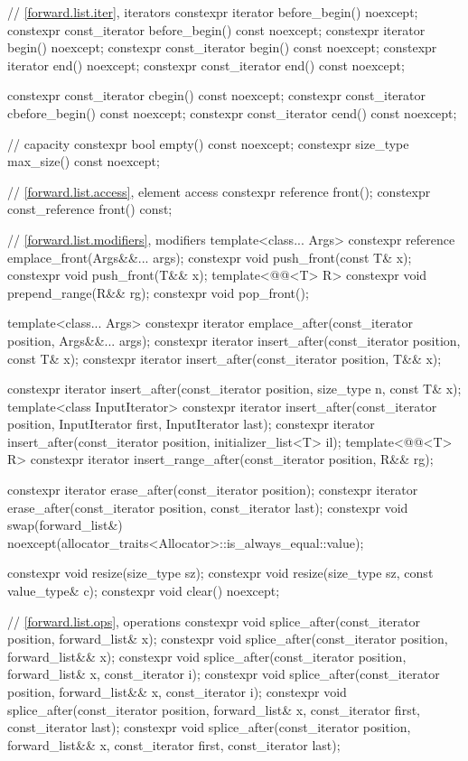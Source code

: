 \begin{codeblock}
{{    // \ref{forward.list.iter}, iterators
    constexpr iterator before_begin() noexcept;
    constexpr const_iterator before_begin() const noexcept;
    constexpr iterator begin() noexcept;
    constexpr const_iterator begin() const noexcept;
    constexpr iterator end() noexcept;
    constexpr const_iterator end() const noexcept;

    constexpr const_iterator cbegin() const noexcept;
    constexpr const_iterator cbefore_begin() const noexcept;
    constexpr const_iterator cend() const noexcept;

    // capacity
    constexpr bool empty() const noexcept;
    constexpr size_type max_size() const noexcept;

    // \ref{forward.list.access}, element access
    constexpr reference front();
    constexpr const_reference front() const;

    // \ref{forward.list.modifiers}, modifiers
    template<class... Args> constexpr reference emplace_front(Args&&... args);
    constexpr void push_front(const T& x);
    constexpr void push_front(T&& x);
    template<@@<T> R>
      constexpr void prepend_range(R&& rg);
    constexpr void pop_front();

    template<class... Args>
      constexpr iterator emplace_after(const_iterator position, Args&&... args);
    constexpr iterator insert_after(const_iterator position, const T& x);
    constexpr iterator insert_after(const_iterator position, T&& x);

    constexpr iterator insert_after(const_iterator position, size_type n, const T& x);
    template<class InputIterator>
      constexpr iterator insert_after(const_iterator position,
                                      InputIterator first, InputIterator last);
    constexpr iterator insert_after(const_iterator position, initializer_list<T> il);
    template<@@<T> R>
      constexpr iterator insert_range_after(const_iterator position, R&& rg);

    constexpr iterator erase_after(const_iterator position);
    constexpr iterator erase_after(const_iterator position, const_iterator last);
    constexpr void swap(forward_list&)
      noexcept(allocator_traits<Allocator>::is_always_equal::value);

    constexpr void resize(size_type sz);
    constexpr void resize(size_type sz, const value_type& c);
    constexpr void clear() noexcept;

    // \ref{forward.list.ops},  operations
    constexpr void splice_after(const_iterator position, forward_list& x);
    constexpr void splice_after(const_iterator position, forward_list&& x);
    constexpr void splice_after(const_iterator position, forward_list& x, const_iterator i);
    constexpr void splice_after(const_iterator position, forward_list&& x, const_iterator i);
    constexpr void splice_after(const_iterator position, forward_list& x,
                                const_iterator first, const_iterator last);
    constexpr void splice_after(const_iterator position, forward_list&& x,
                                const_iterator first, const_iterator last);

}}
\end{codeblock}
